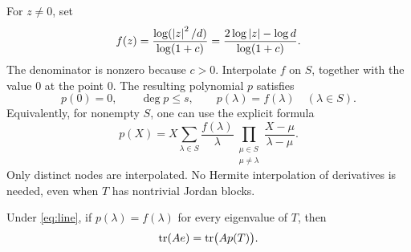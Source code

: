 For \(z\ne0\), set
\begin{equation}\label{eq:log-weight}
 f(z)=\frac{\log(\left|z\right|^2/d)}{\log(1+c)}
     =\frac{2\log\left|z\right|-\log d}{\log(1+c)}.
\end{equation}
The denominator is nonzero because \(c>0\). Interpolate \(f\) on \(S\), together
with the value \(0\) at the point \(0\). The resulting polynomial \(p\) satisfies
\begin{equation}\label{eq:polynomial}
 p(0)=0,\qquad \deg p\leq s,\qquad p(\lambda)=f(\lambda)\quad(\lambda\in S).
\end{equation}
Equivalently, for nonempty \(S\), one can use the explicit formula
\[
 p(X)=X\sum_{\lambda\in S}\frac{f(\lambda)}{\lambda}
          \prod_{\substack{\mu\in S\\\mu\ne\lambda}}
          \frac{X-\mu}{\lambda-\mu}.
\]
Only distinct nodes are interpolated. No Hermite interpolation of derivatives
is needed, even when \(T\) has nontrivial Jordan blocks.

\begin{lemma}\label{lem:spectral-certificate}
Under \eqref{eq:line}, if \(p(\lambda)=f(\lambda)\) for every eigenvalue of \(T\),
then
\begin{equation}\label{eq:certificate}
 \operatorname{tr}(Ae)=\operatorname{tr}\bigl(Ap(T)\bigr).
\end{equation}
\end{lemma}

